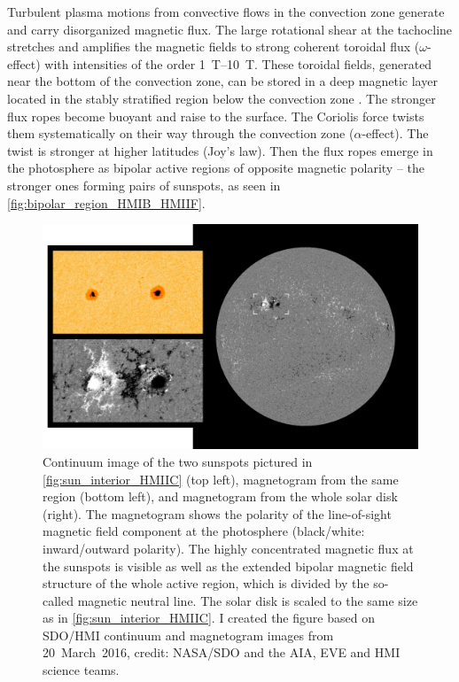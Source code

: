 Turbulent plasma motions from convective flows in the convection zone generate and carry disorganized magnetic flux. The large rotational shear at the tachocline stretches and amplifies the magnetic fields to strong coherent toroidal flux ($\omega$-effect) with intensities of the order \SIrange{1}{10}{\tesla}. These toroidal fields, generated near the bottom of the convection zone, can be stored in a deep magnetic layer located in the stably stratified region below the convection zone \citep{Ossendrijver2003}. The stronger flux ropes become buoyant and raise to the surface. The Coriolis force twists them systematically on their way through the convection zone ($\alpha$-effect). The twist is stronger at higher latitudes (Joy's law). Then the flux ropes emerge in the photosphere as bipolar active regions of opposite magnetic polarity -- the stronger ones forming pairs of sunspots, as seen in \autoref{fig:bipolar_region_HMIB_HMIIF}.
\begin{figure}[htb]
	\centering
	\includegraphics[width=\textwidth]{figures_of_mine/schemata/bipolar_region_HMIB_HMIIF.png}
	\caption[I created the figure based on SDO/HMI continuum and magnetogram images from 20~March~2016, credit: NASA/SDO and the AIA, EVE and HMI science teams.]
	{Continuum image of the two sunspots pictured in \autoref{fig:sun_interior_HMIIC} (top left), magnetogram from the same region (bottom left), and magnetogram from the whole solar disk (right). The magnetogram shows the polarity of the line-of-sight magnetic field component at the photosphere (black/white: inward/outward polarity). The highly concentrated magnetic flux at the sunspots is visible as well as the extended bipolar magnetic field structure of the whole active region, which is divided by the so-called magnetic neutral line. The solar disk is scaled to the same size as in \autoref{fig:sun_interior_HMIIC}. I created the figure based on SDO/HMI continuum and magnetogram images from 20~March~2016, credit: NASA/SDO and the AIA, EVE and HMI science teams.}
	\label{fig:bipolar_region_HMIB_HMIIF}
\end{figure}
